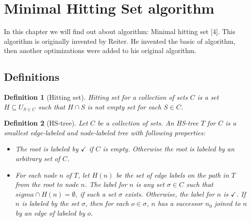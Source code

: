 \documentclass[12pt,a4paper]{article}
\newtheorem{definition}{Definition}[subsection]
\begin{document}
\section{Minimal Hitting Set algorithm}
In this chapter we will find out about algorithm: Minimal hitting set [4]. This algorithm is originally invented by Reiter. He invented the basic of algorithm, then another optimizations were added to his original algorithm.

\subsection{Definitions}

\begin{definition}[Hitting set]
	Hitting set for a collection of sets $C$ is a set $H \subseteq U_{S \in C}$ such that $H \cap S$ is not empty set for each $S \in C$.
\end{definition}

\begin{definition}[HS-tree]
	Let $C$ be a collection of sets. An HS-tree $T$ for $C$ is a smallest edge-labeled and node-labeled tree with following properties:

	\begin{itemize}
		\item The root is labeled by $\checkmark$ if $C$ is empty. Otherwise the root is labeled by an arbitrary set of $C$.
		
		\item For each node $n$ of $T$, let $H(n)$ be the set of edge labels on the path in $T$ from the root to node $n$. The label for $n$ is any set $\sigma \in C$ such that $sigma \cap H(n) = \emptyset$, if such a set $\sigma$ exists. Otherwise, the label for $n$ is $\checkmark$. If $n$ is labeled by the set $\sigma$, then for each $o \in \sigma$, $n$ has a successor $n_{0}$ joined to $n$ by an edge of labeled by $o$.
	\end{itemize}
	
\end{definition}
\end{document}
